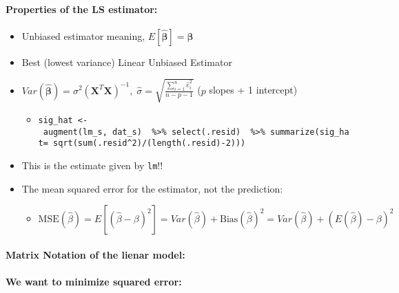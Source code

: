\documentclass[]{article}
\providecommand{\tightlist}{%
  \setlength{\itemsep}{0pt}\setlength{\parskip}{0pt}}
\let\oldparagraph\paragraph
\renewcommand{\paragraph}[1]{\oldparagraph{#1}\mbox{}}
\begin{document}
\hypertarget{properties-of-the-ls-estimator}{%
\paragraph{Properties of the LS
estimator:}\label{properties-of-the-ls-estimator}}

\begin{itemize}
\tightlist
\item
  Unbiased estimator meaning,
  \(E[\hat{\mathbf{\beta}}]=\mathbf{\beta}\)\\
\item
  Best (lowest variance) Linear Unbiased Estimator
\item
  \(Var(\hat{\mathbf{\beta}})=\sigma^2(\mathbf{X}^T\mathbf{X})^{-1}, \; \hat{\sigma}=\sqrt{\frac{\sum_{i=1}^n\hat{e}_i^2}{n-p-1}}\)
  (\(p\) slopes + 1 intercept)

  \begin{itemize}
  \tightlist
  \item
    \texttt{sig\_hat\ \textless{}-\ augment(lm\_s,\ dat\_s)\ \ \%\textgreater{}\%\ select(.resid)\ \ \%\textgreater{}\%\ summarize(sig\_hat=\ sqrt(sum(.resid\^{}2)/(length(.resid)-2)))}
  \end{itemize}
\item
  This is the estimate given by \texttt{lm}!!
\item
  The mean squared error for the estimator, not the prediction:

  \begin{itemize}
  \tightlist
  \item
    \(\text{MSE}(\hat{\beta})=E[(\hat{\beta}-\beta)^2]= Var(\hat{\beta})+\text{Bias}(\hat{\beta})^2= Var(\hat{\beta})+(E(\hat{\beta})-\beta)^2\)
  \end{itemize}
\end{itemize}

\hypertarget{matrix-notation-of-the-lienar-model}{%
\paragraph{Matrix Notation of the lienar
model:}\label{matrix-notation-of-the-lienar-model}}

\hypertarget{we-want-to-minimize-squared-error}{%
\paragraph{We want to minimize squared
error:}\label{we-want-to-minimize-squared-error}}
\end{document}

